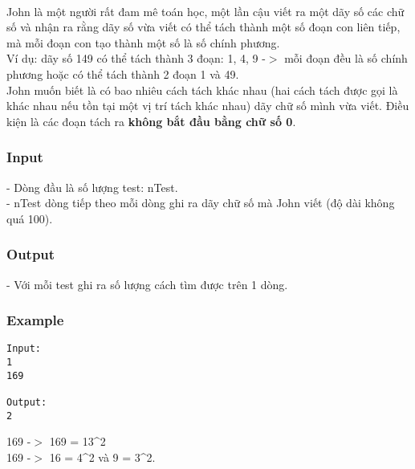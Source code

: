 

 

John là một người rất đam mê toán học, một lần cậu viết ra một dãy số các chữ số và nhận ra rằng dãy số vừa viết có thể tách thành một số đoạn con liên tiếp, mà mỗi đoạn con tạo thành một số là số chính phương.
\\Ví dụ: dãy số 149 có thể tách thành 3 đoạn: 1, 4, 9 -$>$ mỗi đoạn đều là số chính phương hoặc có thể tách thành 2 đoạn 1 và 49.
\\John muốn biết là có bao nhiêu cách tách khác nhau (hai cách tách được gọi là khác nhau nếu tồn tại một vị trí tách khác nhau) dãy chữ số mình vừa viết. Điều kiện là các đoạn tách ra \textbf{không bắt đầu bằng chữ số 0}.

\subsubsection{Input}

- Dòng đầu là số lượng test: nTest.
\\- nTest dòng tiếp theo mỗi dòng ghi ra dãy chữ số mà John viết (độ dài không quá 100).

\subsubsection{Output}

- Với mỗi test ghi ra số lượng cách tìm được trên 1 dòng.

\subsubsection{Example}
\begin{verbatim}
Input:
1
169

Output:
2
\end{verbatim}

169 -$>$ 169 = 13\textasciicircum2
\\169 -$>$ 16 = 4\textasciicircum2 và 9 = 3\textasciicircum2.